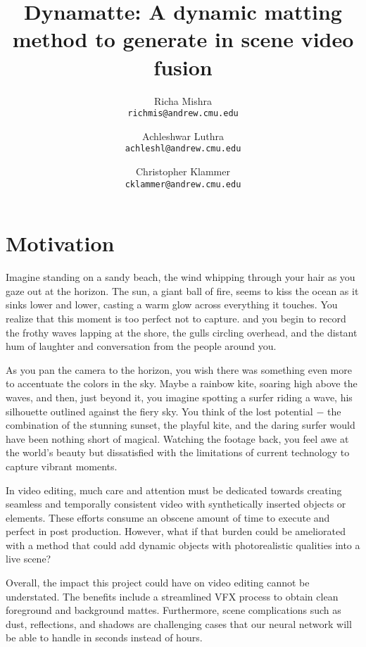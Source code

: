 \documentclass{article}
\title{Dynamatte: A dynamic matting method to generate in scene video fusion}
\author{Richa Mishra \\
\small\texttt{richmis@andrew.cmu.edu}
\and
Achleshwar Luthra \\
\small\texttt{achleshl@andrew.cmu.edu}
\and
Christopher Klammer \\
\small\texttt{cklammer@andrew.cmu.edu}}
\begin{document}
\maketitle


\section{Motivation}

Imagine standing on a sandy beach, the wind whipping through your hair as you gaze out at the horizon. The sun, a giant ball of fire, seems to kiss the ocean as it sinks lower and lower, casting a warm glow across everything it touches. You realize that this moment is too perfect not to capture. and you begin to record the frothy waves lapping at the shore, the gulls circling overhead, and the distant hum of laughter and conversation from the people around you.

As you pan the camera to the horizon, you wish there was something even more to accentuate the colors in the sky. Maybe a rainbow kite, soaring high above the waves, and then, just beyond it, you imagine spotting a surfer riding a wave, his silhouette outlined against the fiery sky. You think of the lost potential $-$ the combination of the stunning sunset, the playful kite, and the daring surfer would have been nothing short of magical. Watching the footage back, you feel awe at the world's beauty but dissatisfied with the limitations of current technology to capture vibrant moments.

In video editing, much care and attention must be dedicated towards creating seamless and temporally consistent video with synthetically inserted objects or elements. These efforts consume an obscene amount of time to execute and perfect in post production. However, what if that burden could be ameliorated with a method that could add dynamic objects with photorealistic qualities into a live scene? 

Overall, the impact this project could have on video editing cannot be understated. The benefits include a streamlined VFX process to obtain clean foreground and background mattes. Furthermore, scene complications such as dust, reflections, and shadows are challenging cases that our neural network will be able to handle in seconds instead of hours.
\end{document}
